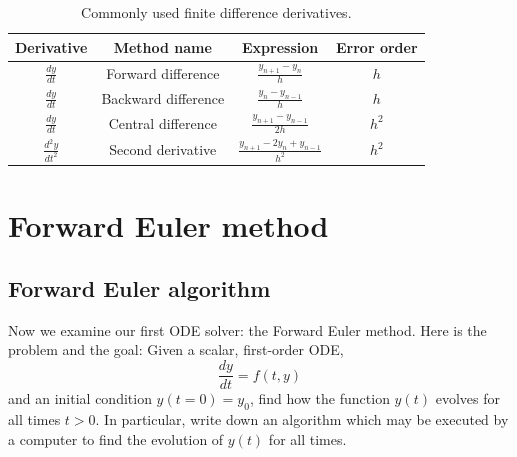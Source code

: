 \documentclass[hidelinks,notitlepage]{book}
\begin{document}
\begin{table}[h]
\begin{center}
	\renewcommand{\arraystretch}{1.5}
	
\begin{tabular}{ |c|c|c|c| } 

	\hline
	 \textbf{Derivative} & \textbf{Method name} & \textbf{Expression} & \textbf{Error order} \\ 
	\hline
	$\frac{d y}{d t}$ & Forward difference & $\frac{y_{n+1}-y_n}{h}$ & $h$ \\ 
	$\frac{d y}{d t}$ & Backward difference & $\frac{y_{n}-y_{n-1}}{h}$  & $h$ \\ 
	$\frac{d y}{d t}$ & Central difference & $\frac{y_{n+1}-y_{n-1}}{2 h}$  & $h^2$ \\ 
	$\frac{d^2 y}{d t^2}$ & Second derivative & $\frac{y_{n+1}-2 y_{n}+y_{n-1}}{h^2}$  & $h^2$ \\ 
	\hline
\end{tabular}
\caption{Commonly used finite difference derivatives.}\label{tab:FiniteDiffExpressions}
\end{center}
\end{table}

\chapter{Forward Euler method}
\section{Forward Euler algorithm}
\label{sect:ForwardEulerMethod}
Now we examine our first ODE solver:  the Forward Euler method.  Here is the problem and the goal:  Given a scalar, first-order ODE,
\begin{equation}
\label{eq:FirstOrderODE}
\frac{d y}{d t} = f(t, y) 
\end{equation}
and an initial condition $y(t=0) = y_0$, find how the function $y(t)$ evolves for all times $t > 0$.  In particular, write down an algorithm which may be executed by a computer to find the evolution of $y(t)$ for all times.
\end{document}
